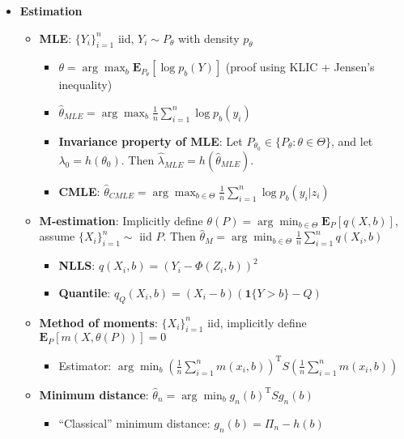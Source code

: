 \documentclass[12pt,english]{article}
\newcommand{\T}{\ensuremath{\text{T}}}
\begin{document}
\begin{itemize}
\item \textbf{Estimation}
	\begin{itemize}
		\item \textbf{MLE}: $\{ Y_{i} \}_{i=1}^{n}$ iid, $Y_{i} \sim P_{\theta}$ with density $p_{\theta}$
		\begin{itemize}
			\item $\theta = \arg \max_{b} \mathbf{E}_{P_{\theta}} [\log p_{b}(Y)]$ (proof using KLIC + Jensen's inequality)
			\item $\hat{\theta}_{MLE} = \arg \max_{b} \frac{1}{n} \sum_{i=1}^{n} \log p_{b}(y_{i})$
			\item \textbf{Invariance property of MLE}: Let $P_{\theta_{0}} \in \{P_{\theta} : \theta \in \Theta\}$, and let $\lambda_{0} = h(\theta_{0})$. Then $\hat{\lambda}_{MLE} = h(\hat{\theta}_{MLE})$.
			\item \textbf{CMLE}: $\hat{\theta}_{CMLE} = \arg \max_{b \in \Theta} \frac{1}{n} \sum_{i=1}^{n} \log p_{b}(y_{i} | z_{i})$
		\end{itemize}
		\item \textbf{M-estimation}: Implicitly define $\theta(P) = \arg \min_{b \in \Theta} \mathbf{E}_{P} [q(X, b)]$, assume $\{ X_{i} \}_{i=1}^{n} \sim$ iid $P$. Then $\hat{\theta}_{M} = \arg \min_{b \in \Theta} \frac{1}{n} \sum_{i=1}^{n} q(X_{i}, b)$
		\begin{itemize}
			\item \textbf{NLLS}: $q(X_{i}, b) = (Y_{i} - \Phi(Z_{i}, b))^{2}$
			\item \textbf{Quantile}: $q_{Q}(X_{i}, b) = (X_{i} - b)(\mathbf{1}\{ Y > b \} - Q)$
		\end{itemize}
		\item \textbf{Method of moments}: $\{ X_{i} \}_{i=1}^{n}$ iid, implicitly define $\mathbf{E}_{P}[m(X, \theta(P))] = 0$
		\begin{itemize}
			\item Estimator: $\arg \min_{b} (\frac{1}{n} \sum_{i=1}^{n} m(x_{i}, b))^{\T} S (\frac{1}{n} \sum_{i=1}^{n} m(x_{i}, b))$
		\end{itemize}
		\item \textbf{Minimum distance}: $\hat{\theta}_{n} = \arg \min_{b} g_{n}(b)^{\T} S g_{n}(b)$
		\begin{itemize}
			\item ``Classical'' minimum distance: $g_{n}(b) = \Pi_{n} - h(b)$
		\end{itemize}
	\end{itemize}

\end{itemize}
\end{document}

